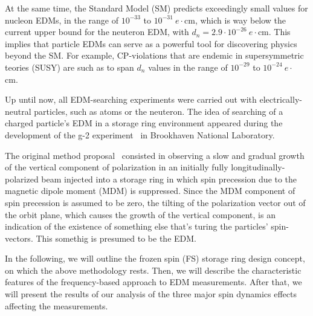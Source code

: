 \documentclass[]{elsarticle}
\begin{document}
At the same time, the Standard Model (SM) predicts exceedingly small values for nucleon EDMs,
in the range of $10^{-33}$ to $10^{-31}~e\cdot$cm,
which is way below the current upper bound for the neuteron EDM,
with $d_n = 2.9\cdot 10^{-26}~e\cdot$cm. This implies that particle EDMs can serve as a powerful tool
for discovering physics beyond the SM. For example, CP-violations that are endemic in
supersymmetric teories (SUSY) are such as to span $d_n$ values in the range of
$10^{-29}$ to $10^{-24}~e\cdot$cm.~\cite{JEDI}

Up until now, all EDM-searching experiments were carried out with electrically-neutral particles, such as
atoms or the neuteron. The idea of searching of a charged particle's EDM in a storage ring environment
appeared during the development of the g-2 experiment~\cite{BNL:g-2:2001} in Brookhaven National Laboratory.

The original method proposal~\cite{BNL:Deuteron2008} consisted in observing a slow and gradual
growth of the vertical component of polarization in an initially fully longitudinally-polarized beam
injected into a storage ring in which spin precession due to the magnetic dipole moment (MDM) is suppressed.
Since the MDM component of spin precession is assumed to be zero, the tilting of the polarization vector
out of the orbit plane, which causes the growth of the vertical component, is an indication of the existence
of something else that's turing the particles' spin-vectors. This somethig is presumed to be the EDM.

In the following, we will outline the frozen spin (FS) storage ring design concept,
on which the above methodology rests. Then, we will describe the characteristic features
of the frequency-based approach to EDM measurements. After that, we will present the results of our
analysis of the three major spin dynamics effects affecting the measurements.
\end{document}

